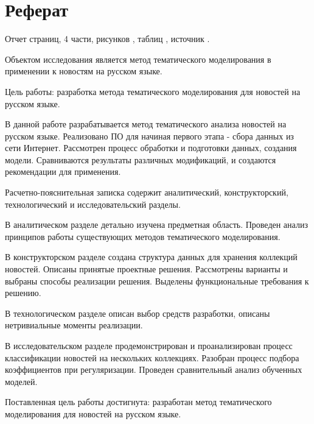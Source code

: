 \chapter*{Реферат}

Отчет страниц, 4 части, \todo{} рисунков\todo{} , \todo{} таблиц\todo{} , \todo{} источник\todo{} .

Объектом исследования является метод тематического моделирования в применении к новостям на русском языке.

Цель работы: разработка метода тематического моделирования для новостей на русском языке.

В данной работе разрабатывается метод тематического анализа новостей на русском языке. Реализовано ПО для  начиная первого этапа - сбора данных из сети Интернет. Рассмотрен процесс обработки и подготовки данных, создания модели. Сравниваются результаты различных модификаций, и создаются рекомендации для применения.


Расчетно-пояснительная записка содержит аналитический, конструкторский, технологический и исследовательский разделы.

В аналитическом разделе детально изучена предметная область. Проведен анализ принципов работы существующих методов тематического моделирования.

В конструкторском разделе создана структура данных для хранения коллекций новостей. Описаны принятые проектные решения. Рассмотрены варианты и выбраны способы реализации решения. Выделены функциональные требования к решению.

В технологическом разделе описан выбор средств разработки, описаны нетривиальные моменты реализации. 

В исследовательском разделе продемонстрирован и проанализирован процесс классификации новостей на нескольких коллекциях. Разобран процесс подбора коэффициентов при регуляризации. Проведен сравнительный анализ обученных моделей.

Поставленная цель работы достигнута: разработан метод тематического моделирования для новостей на русском языке.